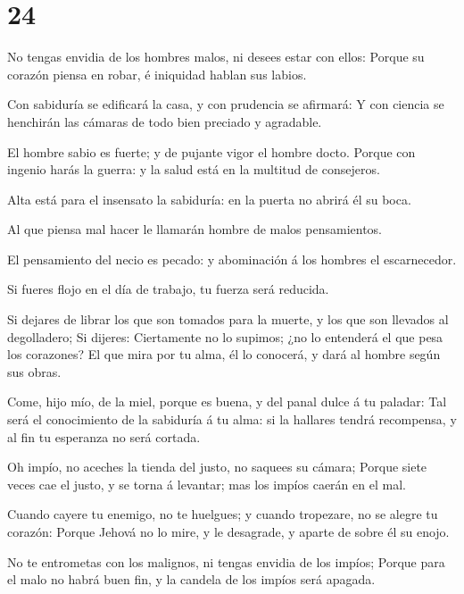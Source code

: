 \hypertarget{section-20-24}{%
\section{24}\label{section-20-24}}

 No tengas envidia de los hombres malos, ni desees estar
con ellos:  Porque su corazón piensa en robar, é iniquidad
hablan sus labios.

 Con sabiduría se edificará la casa, y con prudencia se
afirmará:  Y con ciencia se henchirán las cámaras de todo
bien preciado y agradable.

 El hombre sabio es fuerte; y de pujante vigor el hombre
docto.  Porque con ingenio harás la guerra: y la salud
está en la multitud de consejeros.

 Alta está para el insensato la sabiduría: en la puerta no
abrirá él su boca.

 Al que piensa mal hacer le llamarán hombre de malos
pensamientos.

 El pensamiento del necio es pecado: y abominación á los
hombres el escarnecedor.

 Si fueres flojo en el día de trabajo, tu fuerza será
reducida.

 Si dejares de librar los que son tomados para la muerte,
y los que son llevados al degolladero;  Si dijeres:
Ciertamente no lo supimos; ¿no lo entenderá el que pesa los corazones?
El que mira por tu alma, él lo conocerá, y dará al hombre según sus
obras.

 Come, hijo mío, de la miel, porque es buena, y del panal
dulce á tu paladar:  Tal será el conocimiento de la
sabiduría á tu alma: si la hallares tendrá recompensa, y al fin tu
esperanza no será cortada.

 Oh impío, no aceches la tienda del justo, no saquees su
cámara;  Porque siete veces cae el justo, y se torna á
levantar; mas los impíos caerán en el mal.

 Cuando cayere tu enemigo, no te huelgues; y cuando
tropezare, no se alegre tu corazón:  Porque Jehová no lo
mire, y le desagrade, y aparte de sobre él su enojo.

 No te entrometas con los malignos, ni tengas envidia de
los impíos;  Porque para el malo no habrá buen fin, y la
candela de los impíos será apagada.

